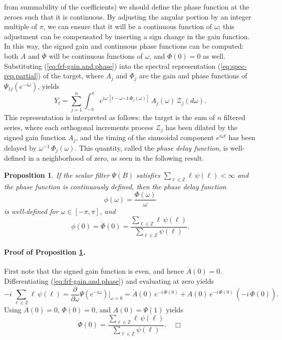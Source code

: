 \documentclass[a4paper]{book}
\def\ZZ{\mathbb Z}
\newtheorem{Proposition}{Proposition}
\begin{document}
 from summability of the coefficients) we should define the phase function at 
 the zeroes such that it is continuous.  By adjusting the angular portion by
 an integer multiple of $\pi$, we can ensure that it will be a continuous function of
 $\omega $; this adjustment can be compensated by inserting a sign change in the gain 
 function.  In this way, the signed gain and continuous phase functions can be
 computed: both $A$ and $\Phi$ will be continuous functions of $\omega $, and $\Phi (0) = 0$
 as well.    Substituting (\ref{eq:frf-gain.and.phase})
  into the spectral representation (\ref{eq:spec-rep.partial})
 of the target, where $A_j$ and $\Phi_j$ are the gain and phase functions of $\Psi_{1j} 
  (e^{-i \omega })$,  yields
\[
  Y_t = \sum_{j=1}^n  \int_{-\pi}^{\pi} e^{i \omega  \, [ t - \omega {-1} \,
   \Phi_j (\omega )   ] } \,
  A_j ( \omega ) \,    \mathcal{Z}_j (d\omega ).
\]
 This representation is interpreted as follows: the target is the sum of $n$ filtered
 series, where each orthogonal increments process $\mathcal{Z}_j$ has been dilated
 by the signed gain function $A_j$, and the timing of the sinusoidal component 
 $e^{i \omega  t }$ has been delayed by $\omega ^{-1} \, \Phi_j (\omega )$.  
  This quantity, called the {\em phase delay function},
  is well-defined in a neighborhood of zero, as seen in the following
 result.

\begin{Proposition}
 \label{prop:phase-delay}
  If the scalar filter $\Psi (B)$ satisfies $\sum_{\ell \in \ZZ} \ell \, \psi (\ell) < \infty$
 and the phase function is continuously defined, then the phase delay function
\[
  \phi (\omega ) = \frac{\Phi (\omega ) }{ \omega }
\]
 is well-defined for $\omega  \in [-\pi, \pi]$, and 
\[
 \phi (0) = \dot{\Phi} (0) = \frac{ \sum_{\ell \in \ZZ} \ell \, \psi (\ell) }{ 
  \sum_{\ell \in \ZZ}   \psi (\ell) }.
\]
\end{Proposition}

\paragraph{Proof of Proposition \ref{prop:phase-delay}.}
 First note that the signed gain function is even, and hence $\dot{A} (0) = 0$.
 Differentiating (\ref{eq:frf-gain.and.phase}) and evaluating at zero yields
\[
  -i \, \sum_{\ell \in \ZZ} \ell \, \psi (\ell) = \frac{\partial}{\partial \omega }
  \Psi (e^{-i \omega }) \vert_{\omega = 0}
  = \dot{A} (0) \, e^{-i \, \Phi (0) } + A(0) \, e^{-i \, \Phi (0) } \,
  (-i \, \dot{\Phi} (0)).
\]
  Using $\dot{A} (0) = 0$, $\Phi (0) = 0$, and $A(0) = \Psi (1)$ yields
\[
 \dot{\Phi} (0) = \frac{ \sum_{\ell \in \ZZ} \ell \, \psi (\ell) }{ 
  \sum_{\ell \in \ZZ}   \psi (\ell) }.  \quad \Box
\]
\end{document}
